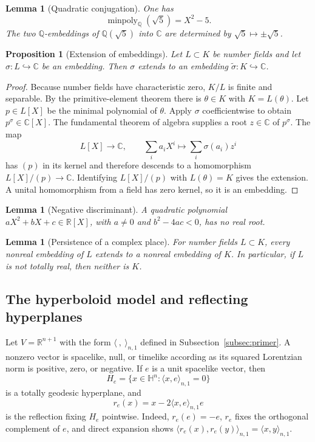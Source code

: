 \documentclass[11pt]{article}
\numberwithin{equation}{section}
\newtheorem{proposition}[theorem]{Proposition}
\newtheorem{lemma}[theorem]{Lemma}
\theoremstyle{definition}
\theoremstyle{remark}
\newcommand{\Q}{\mathbb{Q}}
\newcommand{\R}{\mathbb{R}}
\newcommand{\C}{\mathbb{C}}
\newcommand{\HH}{\mathbb{H}}
\newcommand{\minpoly}{\operatorname{minpoly}}
\begin{document}
\begin{lemma}[Quadratic conjugation]
\label{lem:sqrt5-minpoly}
One has
\[
 \minpoly_\Q(\sqrt5)=X^2-5.
\]
The two \(\Q\)-embeddings of \(\Q(\sqrt5)\) into \(\C\) are
determined by \(\sqrt5\mapsto\pm\sqrt5\).
\end{lemma}

\begin{proposition}[Extension of embeddings]
\label{prop:embedding-extension}
Let \(L\subset K\) be number fields and let
\(\sigma:L\hookrightarrow\C\) be an embedding.  Then \(\sigma\) extends to
an embedding \(\widetilde\sigma:K\hookrightarrow\C\).
\end{proposition}

\begin{proof}
Because number fields have characteristic zero, \(K/L\) is finite and
separable.  By the primitive-element theorem there is \(\theta\in K\) with
\(K=L(\theta)\).  Let \(p\in L[X]\) be the minimal polynomial of \(\theta\).
Apply \(\sigma\) coefficientwise to obtain \(p^\sigma\in\C[X]\).  The
fundamental theorem of algebra supplies a root \(z\in\C\) of
\(p^\sigma\).  The map
\[
 L[X]\longrightarrow\C,
 \qquad \sum_i a_iX^i\longmapsto\sum_i\sigma(a_i)z^i
\]
has \((p)\) in its kernel and therefore descends to a homomorphism
\(L[X]/(p)\to\C\).  Identifying \(L[X]/(p)\) with \(L(\theta)=K\) gives the
extension.  A unital homomorphism from a field has zero kernel, so it is an
embedding.
\end{proof}

\begin{lemma}[Negative discriminant]
\label{lem:quadratic-test}
A quadratic polynomial \(aX^2+bX+c\in\R[X]\), with \(a\ne0\) and
\(b^2-4ac<0\), has no real root.
\end{lemma}

\begin{lemma}[Persistence of a complex place]
\label{prop:subfield-persists}
For number fields \(L\subset K\), every nonreal embedding of \(L\)
extends to a nonreal embedding of \(K\).  In particular, if \(L\) is not
totally real, then neither is \(K\).
\end{lemma}

\subsection{The hyperboloid model and reflecting hyperplanes}

Let \(V=\R^{n+1}\) with the form \(\langle\ ,\ \rangle_{n,1}\) defined in
Subsection~\ref{subsec:primer}.  A nonzero vector is spacelike, null, or
timelike according as its squared Lorentzian norm is positive, zero, or
negative.  If \(e\) is a unit spacelike vector, then
\[
 H_e=\{x\in\HH^n:\langle x,e\rangle_{n,1}=0\}
\]
is a totally geodesic hyperplane, and
\[
 r_e(x)=x-2\langle x,e\rangle_{n,1}e
\]
is the reflection fixing \(H_e\) pointwise.  Indeed,
\(r_e(e)=-e\), \(r_e\) fixes the orthogonal complement of \(e\), and direct
expansion shows
\(\langle r_e(x),r_e(y)\rangle_{n,1}=\langle x,y\rangle_{n,1}\).
\end{document}
